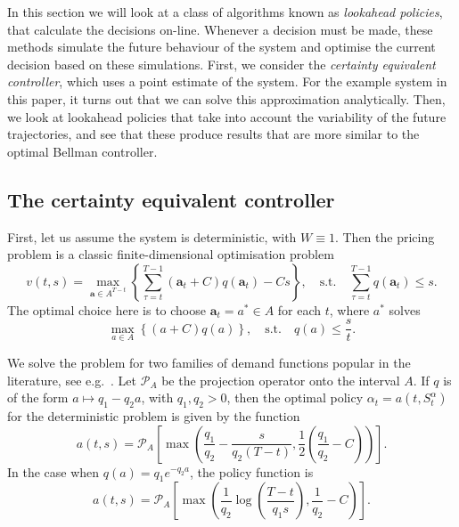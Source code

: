 \documentclass[main.tex]{subfiles}
\begin{document}
In this section we will look at a class of algorithms known as
\emph{lookahead policies}, that calculate the decisions on-line.
Whenever a decision must be made, these methods simulate the future
behaviour of the system and optimise the current decision based on
these simulations. First, we consider the \emph{certainty equivalent
  controller}, which uses a point estimate of the system. For the
example system in this paper, it turns out that we can solve
this approximation analytically.
Then, we look at lookahead policies that take into account the
variability of the future trajectories, and see that these produce
results that are more similar to the optimal Bellman controller.

\subsection{The certainty equivalent controller}

First, let us assume the system is deterministic, with
$W\equiv 1$.
Then the pricing problem is a classic finite-dimensional optimisation
problem
\begin{equation}
  v(t,s)=\max_{\mathbf a\in A^{T-t}}\left\{\sum_{\tau=t}^{T-1}(\mathbf
    a_t+C)q(\mathbf a_t)-Cs\right\},
  \quad \text{s.t.}\quad \sum_{\tau=t}^{T-1}q(\mathbf a_t)\leq s.
\end{equation}
The optimal choice here is to choose $\mathbf a_t=a^*\in A$ for each
$t$, where $a^*$ solves
\begin{equation}
  \max_{a\in A} \left\{(a+C)q(a)\right\},\quad\text{s.t.}\quad
  q(a)\leq \frac{s}{t}.
\end{equation}

We solve the problem for two families of demand functions popular in
the literature, see e.g.~\citep[Ch.~7]{talluri2006theory}.
Let $\mathcal P_A$ be the projection operator onto the interval $A$.
If $q$ is of the form $a\mapsto q_1-q_2a$, with $q_1,q_2> 0$, then
the optimal policy $\alpha_t=a(t,S_t^\alpha)$ for the deterministic
problem is given by the function
\begin{equation}
  a(t,s)=\mathcal P_A \left[ \max\left(
      \frac{q_1}{q_2}-\frac{s}{q_2(T-t)},\frac{1}{2}\left(\frac{q_1}{q_2}-C
      \right) \right) \right].
\end{equation}
In the case when $q(a)=q_1e^{-q_2a}$, the policy function is
\begin{equation}
  a(t,s)=\mathcal P_A\left[
    \max\left( \frac{1}{q_2}\log\left( \frac{T-t}{q_1s}\right),
      \frac{1}{q_2}-C  \right)\right].
\end{equation}
\end{document}
